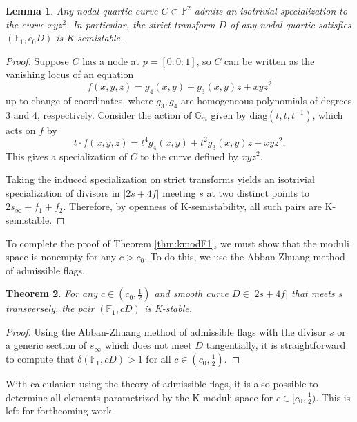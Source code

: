\documentclass[11pt]{amsart}
\numberwithin{equation}{section}
\newtheorem{theorem}{Theorem}[section]
\newtheorem{lemma}[theorem]{Lemma}
\theoremstyle{definition}
\newcommand{\bF}{\mathbb{F}}
\newcommand{\bG}{\mathbb{G}}
\newcommand{\bP}{\mathbb{P}}
\begin{document}
\begin{lemma}
    Any nodal quartic curve $C \subset \bP^2$ admits an isotrivial specialization to the curve $xyz^2$.  In particular, the strict transform $D$ of any nodal quartic satisfies $(\bF_1, c_0D)$ is K-semistable.
\end{lemma}

\begin{proof}
    Suppose $C$ has a node at $p = [0:0:1]$, so $C$ can be written as the vanishing locus of an equation 
    \[ f(x,y,z) = g_4(x,y) + g_3(x,y)z + xyz^2\]
    up to change of coordinates, where $g_3, g_4$ are homogeneous polynomials of degrees 3 and 4, respectively.  Consider the action of $\bG_m$ given by $\mathrm{diag} (t,t,t^{-1})$, which acts on $f$ by
    \[  t \cdot f(x,y,z) = t^4g_4(x,y) + t^2g_3(x,y)z + xyz^2.\]  This gives a specialization of $C$ to the curve defined by $xyz^2$. 

    Taking the induced specialization on strict transforms yields an isotrivial specialization of divisors in $|2s + 4f|$ meeting $s$ at two distinct points to $2s_\infty + f_1 + f_2$.  Therefore, by openness of K-semistability, all such pairs are K-semistable. 
\end{proof}

To complete the proof of Theorem \ref{thm:kmodF1}, we must show that the moduli space is nonempty for any $c > c_0$.  To do this, we use the Abban-Zhuang method of admissible flags. 

\begin{theorem}
    For any $c \in (c_0, \frac{1}{2})$ and smooth curve $D \in |2s + 4f |$ that meets $s$ transversely, the pair $(\bF_1, cD)$ is K-stable. 
\end{theorem} 

\begin{proof}
    Using the Abban-Zhuang method of admissible flags with the divisor $s$ or a generic section of $s_\infty$ which does not meet $D$ tangentially, it is straightforward to compute that $\delta(\bF_1, cD) > 1$ for all $c \in (c_0, \frac{1}{2})$.  
\end{proof}

With calculation using the theory of admissible flags, it is also possible to determine all elements parametrized by the K-moduli space for $ c \in [c_0, \frac{1}{2})$.  This is left for forthcoming work. 


{}

\end{document}

